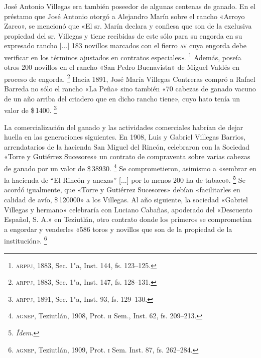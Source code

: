 \documentclass[14pt,twoside,final]{extbook} %
\let\oldfootnote\footnote
\renewcommand\footnote[1]{%
\oldfootnote{\hspace{1mm}#1}}
\begin{document}
José Antonio Villegas era también poseedor de algunas centenas de ganado. En el préstamo que José Antonio otorgó a Alejandro Marín sobre el rancho «Arroyo Zarco», se mencionó que «El sr. Marín declara y confiesa que son de la exclusiva propiedad del sr. Villegas y tiene recibidas de este sólo para su engorda en su expresado rancho [...] 183 novillos marcados con el fierro \textsc{av} cuya engorda debe verificar en los términos ajustados en contratos especiales».\footnote{\textsc{arppj}, 1883, Sec. 1"a, Inst. 144, fs. 123--125.} Además, poseía otros 200 novillos en el rancho «San Pedro Buenavista» de Miguel Valdés en proceso de engorda.\footnote{\textsc{arppj}, 1883, Sec. 1"a, Inst. 147, fs. 128--131.} Hacia 1891, José María Villegas Contreras compró a Rafael Barreda no sólo el rancho «La Peña» sino también «70 cabezas de ganado vacuno de un año arriba del criadero que en dicho rancho tiene», cuyo hato tenía un valor de \$\,1400.\footnote{\textsc{arppj}, 1891, Sec. 1"a, Inst. 93, fs. 129--130.}

La comercialización del ganado y las actividades comerciales habrían de dejar huella en las generaciones siguientes. En 1908, Luis y Gabriel Villegas Barrios, arrendatarios de la hacienda San Miguel del Rincón, celebraron con la Sociedad «Torre y Gutiérrez Sucesores» un contrato de compraventa sobre varias cabezas de ganado por un valor de \$\,38930.\footnote{\textsc{agnep}, Teziutlán, 1908, Prot. \textsc{ii} Sem., Inst. 62, fs. 209--213.} Se comprometieron, asimismo a «sembrar en la hacienda de ``El Rincón y anexas'' [...] por lo menos 200 ha de tabaco».\footnote{\em Ídem.} Se acordó igualmente, que «Torre y Gutiérrez Sucesores» debían «facilitarles en calidad de avío, \$\,120000» a los Villegas. Al año siguiente, la sociedad «Gabriel Villegas y hermano» celebraría con Luciano Cabañas, apoderado del «Descuento Español, S. A.» en Teziutlán, otro contrato donde los primeros se comprometían a engordar y venderles «586 toros y novillos que son de la propiedad de la institución».\footnote{\textsc{agnep}, Teziutlán, 1909, Prot. \textsc{i} Sem. Inst. 87, fs. 262--284.}
\end{document}
